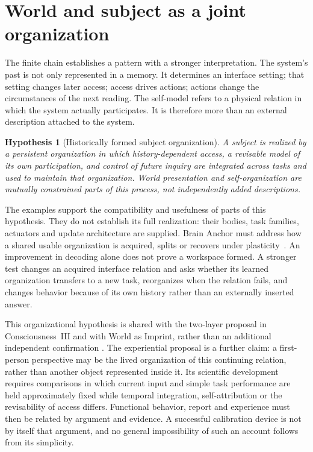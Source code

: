 \documentclass[11pt,a4paper]{article}
\newtheorem{hypothesis}[proposition]{Hypothesis}
\begin{document}
\section{World and subject as a joint organization}

The finite chain establishes a pattern with a stronger interpretation. The system's past is not only represented in a memory. It determines an interface setting; that setting changes later access; access drives actions; actions change the circumstances of the next reading. The self-model refers to a physical relation in which the system actually participates. It is therefore more than an external description attached to the system.

\begin{hypothesis}[Historically formed subject organization]
A subject is realized by a persistent organization in which history-dependent access, a revisable model of its own participation, and control of future inquiry are integrated across tasks and used to maintain that organization. World presentation and self-organization are mutually constrained parts of this process, not independently added descriptions.
\end{hypothesis}

The examples support the compatibility and usefulness of parts of this hypothesis. They do not establish its full realization: their bodies, task families, actuators and update architecture are supplied. Brain Anchor must address how a shared usable organization is acquired, splits or recovers under plasticity~\cite{BrainAnchor}. An improvement in decoding alone does not prove a workspace formed. A stronger test changes an acquired interface relation and asks whether its learned organization transfers to a new task, reorganizes when the relation fails, and changes behavior because of its own history rather than an externally inserted answer.

This organizational hypothesis is shared with the two-layer proposal in Consciousness~III and with World as Imprint, rather than an additional independent confirmation \cite{PaperIII,WorldImprint}. The experiential proposal is a further claim: a first-person perspective may be the lived organization of this continuing relation, rather than another object represented inside it. Its scientific development requires comparisons in which current input and simple task performance are held approximately fixed while temporal integration, self-attribution or the revisability of access differs. Functional behavior, report and experience must then be related by argument and evidence. A successful calibration device is not by itself that argument, and no general impossibility of such an account follows from its simplicity.
\end{document}
